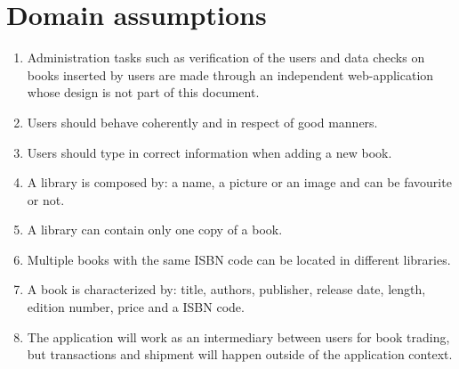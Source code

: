 \section{Domain assumptions}
\begin{enumerate}
    \item Administration tasks such as verification of the users and data checks on books inserted by users are made through an independent web-application whose design is not part of this document.
    \item Users should behave coherently and in respect of good manners.
    \item Users should type in correct information when adding a new book.
    \item A library is composed by: a name, a picture or an image and can be favourite or not.    
    \item A library can contain only one copy of a book.
    \item Multiple books with the same ISBN code can be located in different libraries.
    \item A book is characterized by: title, authors, publisher, release date, length, edition number, price and a ISBN code.
    \item The application will work as an intermediary between users for book trading, but transactions and shipment will happen outside of the application context.
\end{enumerate}

